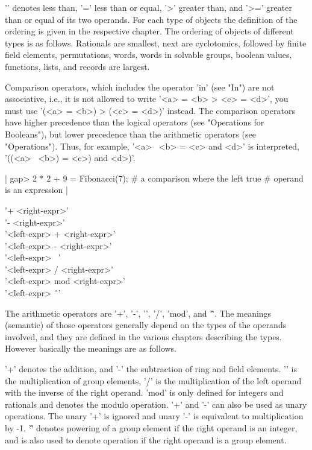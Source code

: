 '\<' denotes less than,  '\<=' less than or  equal, '>' greater than, and
'>=' greater than or equal of its two operands.  For each type of objects
the definition of the  ordering is given in  the respective chapter.  The
ordering  of  objects  of different types  is as follows.  Rationals  are
smallest,  next  are  cyclotomics, followed  by  finite  field  elements,
permutations, words, words in solvable groups, boolean values, functions,
lists, and records are largest.

Comparison operators, which includes the operator 'in' (see "In") are not
associative, i.e., it is not allowed to write '<a> =  <b> \<> <c> = <d>',
you  must use '(<a>  =  <b>) \<>  (<c>  = <d>)'  instead.  The comparison
operators have   higher precedence   than    the logical  operators  (see
"Operations  for  Booleans"),  but lower  precedence  than the arithmetic
operators (see "Operations").  Thus, for example, '<a> \*\ <b> =  <c> and
<d>' is interpreted, '((<a> \*\ <b>) = <c>) and <d>)'.

|    gap> 2 * 2 + 9 = Fibonacci(7);    # a comparison where the left
    true                              # operand is an expression |

%

'+ <right-expr>' \\
'- <right-expr>' \\
'<left-expr> +   <right-expr>' \\
'<left-expr> -   <right-expr>' \\
'<left-expr> \*\ <right-expr>' \\
'<left-expr> /   <right-expr>' \\
'<left-expr> mod <right-expr>' \\
'<left-expr> \^\ <right-expr>'

The arithmetic operators are  '+',  '-',  '\*',  '/',  'mod',  and  '\^'.
The meanings (semantic) of those  operators generally depend on the types
of the operands  involved, and they are  defined in the  various chapters
describing the types.  However basically the meanings are as follows.

'+' denotes the addition,  and '-'  the  subtraction  of ring  and  field
elements.   '\*' is  the  multiplication of  group  elements,  '/' is the
multiplication of the left operand with the inverse of the right operand.
'mod' is only defined for integers  and rationals and denotes  the modulo
operation.  '+' and '-' can also be used as unary  operations.  The unary
'+' is ignored and unary '-' is equivalent to multiplication by -1.  '\^'
denotes powering of a group  element  if the right operand is an integer,
and is  also used to denote operation if  the  right operand  is  a group
element.

